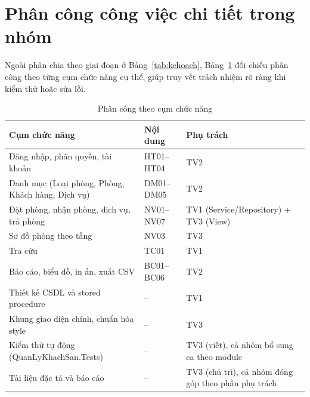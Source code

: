 \documentclass[14pt]{report}
\begin{document}
\section{Phân công công việc chi tiết trong nhóm}
\label{sec:phancong}

Ngoài phân chia theo giai đoạn ở Bảng~\ref{tab:kehoach}, Bảng~\ref{tab:phancong-chucnang} đối chiếu phân công theo từng cụm chức năng cụ thể, giúp truy vết trách nhiệm rõ ràng khi kiểm thử hoặc sửa lỗi.


\begin{table}[H]
\centering
\caption{Phân công theo cụm chức năng}
\label{tab:phancong-chucnang}

\renewcommand{\arraystretch}{1.25}
\setlength{\tabcolsep}{5pt}

\begin{tabularx}{\textwidth}{
    |>{\raggedright\arraybackslash}X
    |>{\centering\arraybackslash}p{2.2cm}
    |>{\raggedright\arraybackslash}X|
}
\hline
\textbf{Cụm chức năng} &
\textbf{Nội dung} &
\textbf{Phụ trách} \\
\hline

Đăng nhập, phân quyền, tài khoản
& HT01--HT04
& TV2 \\
\hline

Danh mục (Loại phòng, Phòng, Khách hàng, Dịch vụ)
& DM01--DM05
& TV2 \\
\hline

Đặt phòng, nhận phòng, dịch vụ, trả phòng
& NV01--NV07
& TV1 (Service/Repository) + TV3 (View) \\
\hline

Sơ đồ phòng theo tầng
& NV03
& TV3 \\
\hline

Tra cứu
& TC01
& TV1 \\
\hline

Báo cáo, biểu đồ, in ấn, xuất CSV
& BC01--BC06
& TV2 \\
\hline

Thiết kế CSDL và stored procedure
& --
& TV1 \\
\hline

Khung giao diện chính, chuẩn hóa style
& --
& TV3 \\
\hline

Kiểm thử tự động (QuanLyKhachSan.Tests)
& --
& TV3 (viết), cả nhóm bổ sung ca theo module \\
\hline

Tài liệu đặc tả và báo cáo
& --
& TV3 (chủ trì), cả nhóm đóng góp theo phần phụ trách \\
\hline

\end{tabularx}
\end{table}
\end{document}

